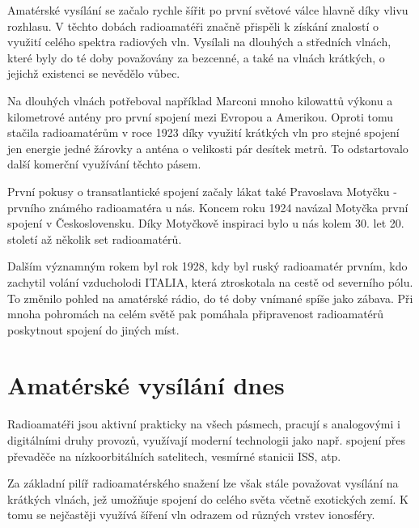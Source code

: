 Amatérské vysílání se začalo rychle šířit po první světové válce hlavně díky vlivu
rozhlasu. %
V těchto dobách radioamatéři značně
přispěli k získání znalostí o využití celého spektra radiových vln. Vysílali na dlouhých a středních vlnách, které byly do té doby
považovány za bezcenné, a také na vlnách krátkých, o jejichž existenci se nevědělo vůbec.

Na dlouhých vlnách potřeboval například Marconi mnoho kilowattů výkonu a kilometrové antény pro první spojení
mezi Evropou a Amerikou. Oproti tomu stačila radioamatérům v roce 1923 díky využití krátkých vln
pro stejné spojení jen energie jedné žárovky a anténa o velikosti pár desítek
metrů. To odstartovalo další komerční
využívání těchto pásem.

První pokusy o transatlantické spojení začaly lákat také Pravoslava Motyčku - prvního známého radioamatéra u nás.
Koncem roku 1924 navázal Motyčka první spojení v Československu. 
Díky Motyčkově inspiraci bylo u nás kolem 30. let 20. století až několik set radioamatérů.

Dalším významným rokem byl rok 1928, kdy byl ruský radioamatér prvním, kdo zachytil volání vzducholodi ITALIA,
která ztroskotala na cestě od severního pólu. To změnilo pohled na amatérské
rádio, do té doby vnímané spíše jako zábava. Při mnoha pohromách na celém světě
pak pomáhala připravenost radioamatérů poskytnout spojení do
jiných míst.

\section{Amatérské vysílání dnes}
\label{radioamateri_dnes}

Radioamatéři jsou aktivní prakticky na všech pásmech, pracují s analogovými i
digitálními druhy provozů, využívají moderní technologii jako např. spojení přes
převaděče na nízkoorbitálních satelitech, vesmírné stanicii ISS, atp. 

Za základní pilíř radioamatérského snažení lze však stále považovat vysílání na
krátkých vlnách, jež umožňuje spojení do celého světa včetně exotických zemí. K
tomu se nejčastěji využívá šíření vln odrazem od různých vrstev ionosféry.

